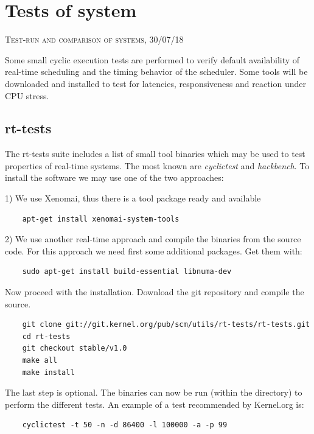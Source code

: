 \documentclass[]{scrartcl}
\begin{document}
\section{Tests of system}

{\small\textsc{Test-run and comparison of systems, 30/07/18} \bigskip}

Some small cyclic execution tests are performed to verify default availability of real-time scheduling and the timing behavior of the scheduler. Some tools will be downloaded and installed to test for latencies, responsiveness and reaction under CPU stress. 

\subsection{rt-tests}

The rt-tests suite includes a list of small tool binaries which may be used to test properties of real-time systems. The most known are \textit{cyclictest} and \textit{hackbench}. To install the software we may use one of the two approaches:

1) We use Xenomai, thus there is a tool package ready and available

\begin{verbatim}
	apt-get install xenomai-system-tools
\end{verbatim}

2) We use another real-time approach and compile the binaries from the source code.
For this approach we need first some additional packages. Get them with:

\begin{verbatim}
	sudo apt-get install build-essential libnuma-dev
\end{verbatim}

Now proceed with the installation. Download the git repository and compile the source.

\begin{verbatim}
	git clone git://git.kernel.org/pub/scm/utils/rt-tests/rt-tests.git
	cd rt-tests
	git checkout stable/v1.0
	make all
	make install
\end{verbatim}

The last step is optional. The binaries can now be run (within the directory) to perform the different tests. An example of a test recommended by Kernel.org is: 

\begin{verbatim}
	cyclictest -t 50 -n -d 86400 -l 100000 -a -p 99
\end{verbatim}
\end{document}
